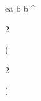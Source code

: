\begin{eqcode}{e}{a }{}{}
  b \in {} \lend
  b \gets \genar \limits ^ {  \begin{tmatrix} %
  2  \lend
  \end{tmatrix} }( \begin{tmatrix}
  2  \lend
  \end{tmatrix})  \lend
\end{eqcode}
